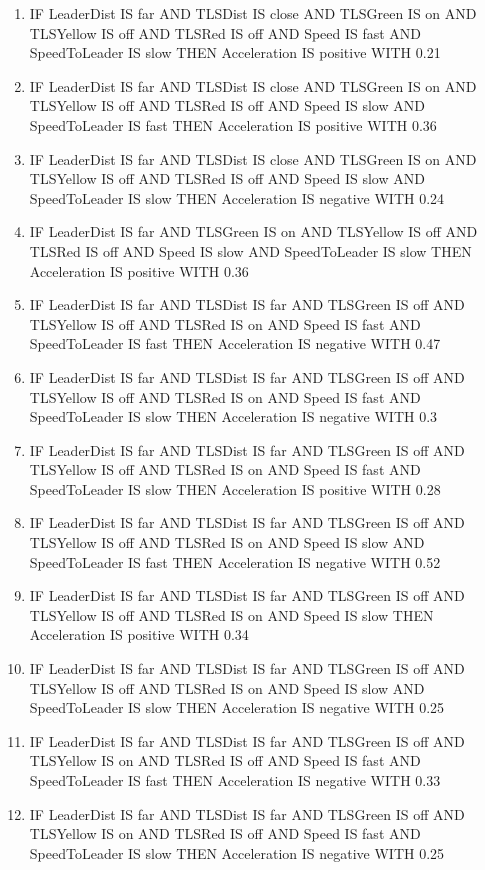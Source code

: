 \begin{enumerate}
	\item IF LeaderDist IS far AND TLSDist IS close AND TLSGreen IS on AND TLSYellow IS off AND TLSRed IS off AND Speed IS fast AND SpeedToLeader IS slow THEN Acceleration IS positive WITH 0.21
	\item IF LeaderDist IS far AND TLSDist IS close AND TLSGreen IS on AND TLSYellow IS off AND TLSRed IS off AND Speed IS slow AND SpeedToLeader IS fast THEN Acceleration IS positive WITH 0.36
	\item IF LeaderDist IS far AND TLSDist IS close AND TLSGreen IS on AND TLSYellow IS off AND TLSRed IS off AND Speed IS slow AND SpeedToLeader IS slow THEN Acceleration IS negative WITH 0.24
	\item IF LeaderDist IS far AND TLSGreen IS on AND TLSYellow IS off AND TLSRed IS off AND Speed IS slow AND SpeedToLeader IS slow THEN Acceleration IS positive WITH 0.36
	\item IF LeaderDist IS far AND TLSDist IS far AND TLSGreen IS off AND TLSYellow IS off AND TLSRed IS on AND Speed IS fast AND SpeedToLeader IS fast THEN Acceleration IS negative WITH 0.47
	\item IF LeaderDist IS far AND TLSDist IS far AND TLSGreen IS off AND TLSYellow IS off AND TLSRed IS on AND Speed IS fast AND SpeedToLeader IS slow THEN Acceleration IS negative WITH 0.3
	\item IF LeaderDist IS far AND TLSDist IS far AND TLSGreen IS off AND TLSYellow IS off AND TLSRed IS on AND Speed IS fast AND SpeedToLeader IS slow THEN Acceleration IS positive WITH 0.28
	\item IF LeaderDist IS far AND TLSDist IS far AND TLSGreen IS off AND TLSYellow IS off AND TLSRed IS on AND Speed IS slow AND SpeedToLeader IS fast THEN Acceleration IS negative WITH 0.52
	\item IF LeaderDist IS far AND TLSDist IS far AND TLSGreen IS off AND TLSYellow IS off AND TLSRed IS on AND Speed IS slow THEN Acceleration IS positive WITH 0.34
	\item IF LeaderDist IS far AND TLSDist IS far AND TLSGreen IS off AND TLSYellow IS off AND TLSRed IS on AND Speed IS slow AND SpeedToLeader IS slow THEN Acceleration IS negative WITH 0.25
	\item IF LeaderDist IS far AND TLSDist IS far AND TLSGreen IS off AND TLSYellow IS on AND TLSRed IS off AND Speed IS fast AND SpeedToLeader IS fast THEN Acceleration IS negative WITH 0.33
	\item IF LeaderDist IS far AND TLSDist IS far AND TLSGreen IS off AND TLSYellow IS on AND TLSRed IS off AND Speed IS fast AND SpeedToLeader IS slow THEN Acceleration IS negative WITH 0.25

\end{enumerate}
